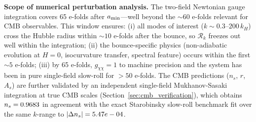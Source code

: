 \documentclass[11pt,a4paper]{article}
\begin{document}
\begin{assumption_box}
\textbf{Scope of numerical perturbation analysis.} The two-field Newtonian gauge integration covers 65 e-folds after $a_{\rm min}$---well beyond the $\sim\!60$ e-folds relevant for CMB observables. This window ensures: (i) all modes of interest ($k \sim 0.3$--$200\,k_H$) cross the Hubble radius within $\sim 10$ e-folds after the bounce, so $\mathcal{R}_k$ freezes out well within the integration; (ii) the bounce-specific physics (non-adiabatic evolution at $H = 0$, isocurvature transfer, spectral feature) occurs within the first $\sim 5$ e-folds; (iii) by 65 e-folds, $g_{\chi\chi} = 1$ to machine precision and the system has been in pure single-field slow-roll for $> 50$ e-folds. The CMB predictions ($n_s$, $r$, $A_s$) are further validated by an independent single-field Mukhanov-Sasaki integration at true CMB scales (Section~\ref{sec:cmb_verification}), which obtains $n_s = 0.9683$ in agreement with the exact Starobinsky slow-roll benchmark fit over the same $k$-range to $|\Delta n_s| = 5.47e-04$.
\end{assumption_box}
\end{document}

